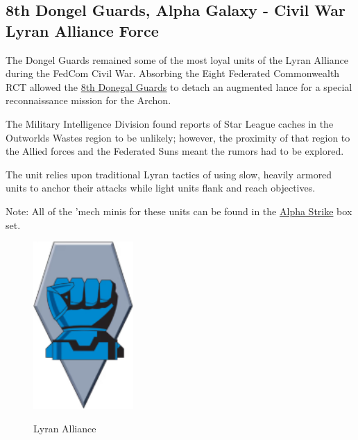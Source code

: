\subsection{8th Dongel Guards, Alpha Galaxy - Civil War Lyran Alliance Force}

The Dongel Guards remained some of the most loyal units of the Lyran Alliance during the FedCom Civil War.
Absorbing the Eight Federated Commonwealth RCT allowed the \href{https://www.sarna.net/wiki/8th_Donegal_Guards}{8th Donegal Guards} to detach an augmented lance for a special reconnaissance mission for the Archon.

The Military Intelligence Division found reports of Star League caches in the Outworlds Wastes region to be unlikely; however, the proximity of that region to the Allied forces and the Federated Suns meant the rumors had to be explored.

The unit relies upon traditional Lyran tactics of using slow, heavily armored units to anchor their attacks while light units flank and reach objectives.
          	
Note: All of the 'mech minis for these units can be found in the \href{https://www.sarna.net/wiki/Alpha_Strike_Boxed_Set}{Alpha Strike} box set.

\begin{figure}[!h]
  \centering
  \includegraphics[alt='Lyran Alliance Logo', width=1.5in, height=2.514in]{img/Lyran-Alliance.png}
  \caption*{Lyran Alliance}
\end{figure}

